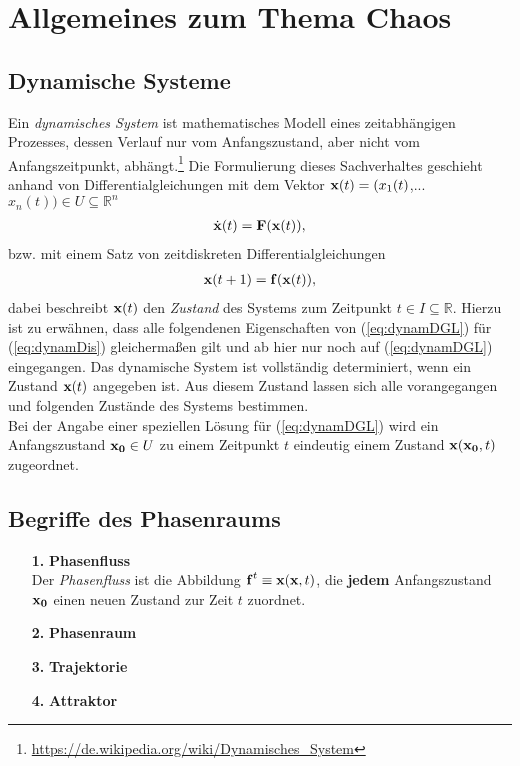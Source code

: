 

\section{Allgemeines zum Thema Chaos}
\label{sec:allgemeines}

\subsection{Dynamische Systeme}
\label{sub:dynamSys}
Ein \textit{dynamisches System} ist mathematisches Modell eines zeitabhängigen Prozesses, dessen Verlauf nur vom Anfangszustand, aber nicht vom Anfangszeitpunkt, abhängt.\footnote{\url{https://de.wikipedia.org/wiki/Dynamisches_System}} Die Formulierung dieses Sachverhaltes geschieht anhand von Differentialgleichungen mit dem Vektor $\boldsymbol{\mathbf{x}}(t)=(x_1(t)$,...$x_n(t))\in{U}\subseteq\mathbb{R}^n$
\begin{gather}
    \dot{\boldsymbol{\mathbf{x}}}(t)=\boldsymbol{\mathbf{F}}(\boldsymbol{\mathbf{x}}(t)),
    \label{eq:dynamDGL}
\end{gather}
bzw. mit einem Satz von zeitdiskreten Differentialgleichungen
\begin{gather}
    \boldsymbol{\mathbf{x}}(t+1)=\boldsymbol{\mathbf{f}}(\boldsymbol{\mathbf{x}}(t)),
    \label{eq:dynamDis}
\end{gather}
dabei beschreibt $\boldsymbol{\mathbf{x}}(t)$ den \textit{Zustand} des Systems zum Zeitpunkt $t\in{I}\subseteq\mathbb{R}$. Hierzu ist zu erwähnen, dass alle folgendenen Eigenschaften von (\ref{eq:dynamDGL}) für (\ref{eq:dynamDis}) gleichermaßen gilt und ab hier nur noch auf (\ref{eq:dynamDGL}) eingegangen. Das dynamische System ist vollständig determiniert, wenn ein Zustand $\boldsymbol{\mathbf{x}}(t)$ angegeben ist. Aus diesem Zustand lassen sich alle vorangegangen und folgenden Zustände des Systems bestimmen.\\
Bei der Angabe einer speziellen Lösung für (\ref{eq:dynamDGL}) wird ein Anfangszustand $\boldsymbol{\mathbf{x_0}}\in{U}$ zu einem Zeitpunkt $t$ eindeutig einem Zustand $\boldsymbol{\mathbf{x}}(\boldsymbol{\mathbf{x_0}},t)$ zugeordnet.

\subsection{Begriffe des Phasenraums}
\label{sub:phasenraum}
\begin{itemize}
    \item[\textbf{1.}]\textbf{Phasenfluss}\\
    Der \textit{Phasenfluss} ist die Abbildung $\boldsymbol{\mathbf{f}}^t\equiv\boldsymbol{\mathbf{x}}(\boldsymbol{\mathbf{x}},t)$, die \textbf{jedem} Anfangszustand $\boldsymbol{\mathbf{x_0}}$ einen neuen Zustand zur Zeit $t$ zuordnet. 
    \item[\textbf{2.}]\textbf{Phasenraum}
    \item[\textbf{3.}]\textbf{Trajektorie}
    \item[\textbf{4.}]\textbf{Attraktor}
\end{itemize}

